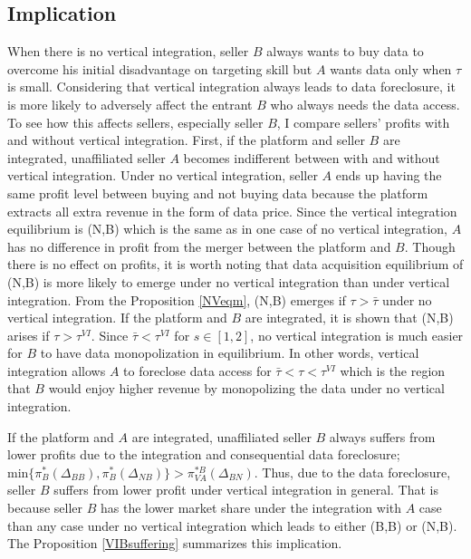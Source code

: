 \documentclass[12pt]{article}
\begin{document}
\subsection{Implication}

When there is no vertical integration, seller $B$ always wants to buy data to overcome his initial disadvantage on targeting skill but $A$ wants data only when $\tau$ is small. Considering that vertical integration always leads to data foreclosure, it is more likely to adversely affect the entrant $B$ who always needs the data access. To see how this affects sellers, especially seller $B$, I compare sellers' profits with and without vertical integration. First, if the platform and seller $B$ are integrated, unaffiliated seller $A$ becomes indifferent between with and without vertical integration. Under no vertical integration, seller $A$ ends up having the same profit level between buying and not buying data because the platform extracts all extra revenue in the form of data price. Since the vertical integration equilibrium is (N,B) which is the same as in one case of no vertical integration, $A$ has no difference in profit from the merger between the platform and $B$. Though there is no effect on profits, it is worth noting that data acquisition equilibrium of (N,B) is more likely to emerge under no vertical integration than under vertical integration. From the Proposition \ref{NVeqm}, (N,B) emerges if $\tau>\bar{\tau}$ under no vertical integration. If the platform and $B$ are integrated, it is shown that (N,B) arises if $\tau>\tau^{VI}$. Since $\bar{\tau}<\tau^{VI}$ for $s \in [1,2]$, no vertical integration is much easier for $B$ to have data monopolization in equilibrium. In other words, vertical integration allows $A$ to foreclose data access for $\bar{\tau}<\tau<\tau^{VI}$ which is the region that $B$ would enjoy higher revenue by monopolizing the data under no vertical integration.

If the platform and $A$ are integrated, unaffiliated seller $B$ always suffers from lower profits due to the integration and consequential data foreclosure; $\text{min}\{\pi^*_B(\Delta_{BB}),\pi^*_B(\Delta_{NB})\}>\pi_{VA}^{*B}(\Delta_{BN})$. Thus, due to the data foreclosure, seller $B$ suffers from lower profit under vertical integration in general. That is because seller $B$ has the lower market share under the integration with $A$ case than any case under no vertical integration which leads to either (B,B) or (N,B). The Proposition \ref{VIBsuffering} summarizes this implication. 
\end{document}
